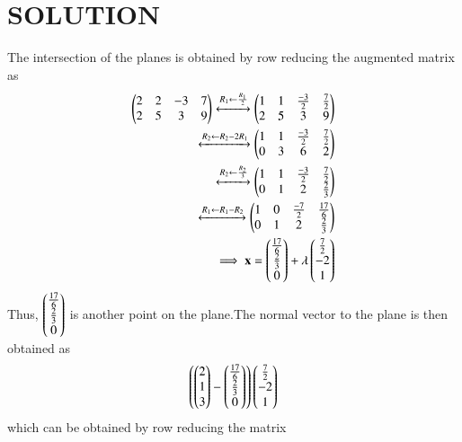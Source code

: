 \documentclass[journal,12pt,twocolumn]{IEEEtran}
\begin{document}
\section{SOLUTION} 
The intersection of the planes is obtained by row reducing the augmented  matrix as 
\begin{align}
\begin{pmatrix}2 & 2 & -3 & 7\\2 & 5 & 3 & 9\end{pmatrix} 
\xleftrightarrow{R_1\leftarrow \frac{R_1}{2}}\begin{pmatrix}1 & 1 & \frac{-3}{2} & \frac{7}{2}\\2 & 5 & 3 & 9\end{pmatrix} 
\\
\xleftrightarrow{R_2\leftarrow R_2 - 2R_1}\begin{pmatrix}1 & 1 & \frac{-3}{2} &\frac{7}{2} \\0 & 3 & 6 & 2\end{pmatrix}
\\
\xleftrightarrow{R_2\leftarrow \frac{R_2}{3}}\begin{pmatrix}1 & 1 & \frac{-3}{2} & \frac{7}{2}\\0 & 1 & 2 & \frac{2}{3}\end{pmatrix}
\\
\xleftrightarrow{R_1\leftarrow R_1 - R_2}\begin{pmatrix}1 & 0 & \frac{-7}{2} & \frac{17}{6}\\0 & 1 & 2 & \frac{2}{3}\end{pmatrix}
\\
\implies\mathbf{x}=\begin{pmatrix}\frac{17}{6} \\ \frac{2}{3} \\ 0\end{pmatrix}+\lambda\begin{pmatrix}\frac{7}{2} \\ -2 \\ 1\end{pmatrix}   \label{eq4}
\end{align}
Thus, $\begin{pmatrix}\frac{17}{6} \\ \frac{2}{3} \\ 0\end{pmatrix}$ is another point on the plane.The normal vector to the plane is then obtained as 
\begin{align}
\begin{pmatrix}\begin{pmatrix}2 \\ 1 \\ 3\end{pmatrix}-\begin{pmatrix}\frac{17}{6} \\ \frac{2}{3} \\ 0\end{pmatrix}\end{pmatrix}\begin{pmatrix}\frac{7}{2} \\ -2 \\ 1\end{pmatrix}
\end{align}
which can be obtained by row reducing the matrix
\end{document}
